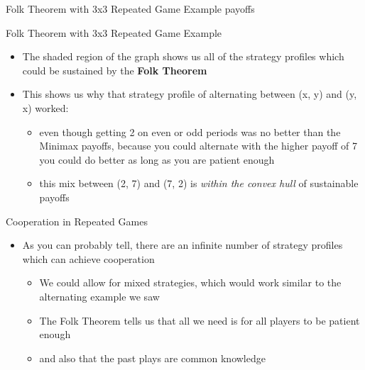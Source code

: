 \begin{frame}{Folk Theorem with 3x3 Repeated Game Example payoffs}
\end{frame}

\begin{frame}{Folk Theorem with 3x3 Repeated Game Example}
  \begin{itemize}
    \item The shaded region of the graph shows us all of the strategy profiles which could be sustained by the \textbf{Folk Theorem} 
    \item This shows us why that strategy profile of alternating between (x, y) and (y, x) worked: 
    \begin{itemize}
      \item even though getting 2 on even or odd periods was no better than the Minimax payoffs, because you could alternate with the higher payoff of 7 you could do better as long as you are patient enough 
      \item this mix between (2, 7) and (7, 2) is \textit{within the convex hull} of sustainable payoffs
    \end{itemize}
  \end{itemize} 
\end{frame}

\begin{frame}{Cooperation in Repeated Games}
  \begin{itemize}
    \item As you can probably tell, there are an infinite number of strategy profiles which can achieve cooperation 
    \begin{itemize}
      \item We could allow for mixed strategies, which would work similar to the alternating example we saw 
      \item The Folk Theorem tells us that all we need is for all players to be patient enough 
      \item and also that the past plays are common knowledge
    \end{itemize}
  \end{itemize}
\end{frame}


